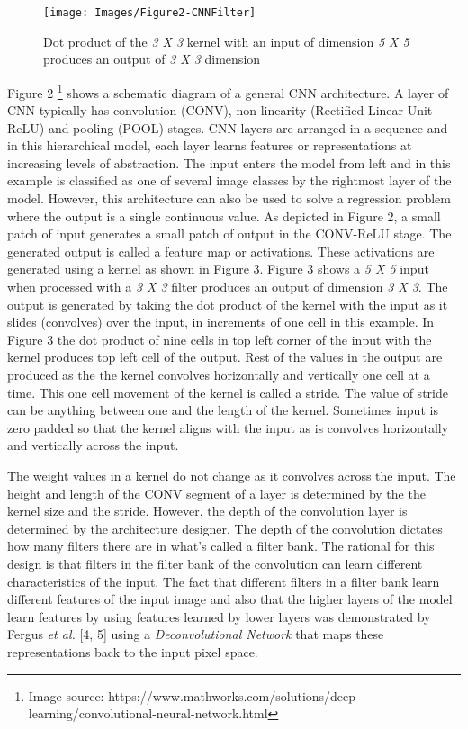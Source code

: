 \documentclass [11pt,letterpaper ,twoside ,openany ]{report}
\begin{document}
    \begin{wrapfigure}{l}{0.5\textwidth}
        \begin{center}
            \texttt{[image: Images/Figure2-CNNFilter]}
        \end{center}
        \caption{Dot product of the \textit{3 X 3} kernel with an input of dimension \textit{5 X 5} produces an output of \textit{3 X 3} dimension}
    \end{wrapfigure}    

    Figure 2 \footnote{Image source: https://www.mathworks.com/solutions/deep-learning/convolutional-neural-network.html} shows a schematic diagram of a general CNN architecture. A layer of CNN typically has convolution (CONV), non-linearity (Rectified Linear Unit --- ReLU) and pooling (POOL) stages. CNN layers are arranged in a sequence and in this hierarchical model, each layer learns features or representations at increasing levels of abstraction. The input enters the model from left and in this example is classified as one of several image classes by the rightmost layer of the model. However, this architecture can also be used to solve a regression problem where the output is a single continuous value. As depicted in Figure 2, a small patch of input generates a small patch of output in the CONV-ReLU stage. The generated output is called a feature map or activations. These activations are generated using a kernel as shown in Figure 3. Figure 3 shows a \textit{5 X 5} input when processed with a  \textit{3 X 3} filter produces an output of dimension \textit{3 X 3}. The output is generated by taking the dot product of the kernel with the input as it slides (convolves) over the input, in increments of one cell in this example. In Figure 3 the dot product of nine cells in top left corner of the input with the kernel produces top left cell of the output. Rest of the values in the output are produced as the the kernel convolves horizontally and vertically one cell at a time. This one cell movement of the kernel is called a stride. The value of stride can be anything between one and the length of the kernel. Sometimes input is zero padded so that the kernel aligns with the input as is convolves horizontally and vertically across the input.

    The weight values in a kernel do not change as it convolves across the input. The height and length of the CONV segment of a layer is determined by the the kernel size and the stride. However, the depth of the convolution layer is determined by the architecture designer. The depth of the convolution dictates how many filters there are in what's called a filter bank. The rational for this design is that filters in the filter bank of the convolution can learn different characteristics of the input. The fact that different filters in a filter bank learn different features of the input image and also that the higher layers of the model learn features by using features learned by lower layers was demonstrated by Fergus \textit{et al.} [4, 5] using a \textit{Deconvolutional Network} that maps these representations back to the input pixel space. 
\end{document}
